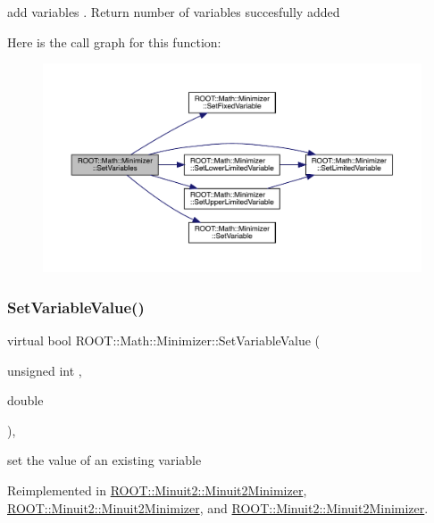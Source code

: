 add variables . Return number of variables succesfully added 

Here is the call graph for this function\+:
\nopagebreak
\begin{figure}[H]
\begin{center}
\leavevmode
\includegraphics[width=350pt]{dc/dc4/classROOT_1_1Math_1_1Minimizer_a314040274ee907fba52726275a28c9f7_cgraph}
\end{center}
\end{figure}
\mbox{\label{classROOT_1_1Math_1_1Minimizer_a47e9a16c7a0b4ecfe769ee4be048d5c3}} 
\subsubsection{\texorpdfstring{SetVariableValue()}{SetVariableValue()}\hspace{0.1cm}{\footnotesize\ttfamily [1/3]}}
{\footnotesize\ttfamily virtual bool R\+O\+O\+T\+::\+Math\+::\+Minimizer\+::\+Set\+Variable\+Value (\begin{DoxyParamCaption}\item[{unsigned int}]{,  }\item[{double}]{ }\end{DoxyParamCaption})\hspace{0.3cm}{\ttfamily [inline]}, {\ttfamily [virtual]}}



set the value of an existing variable 



Reimplemented in \mbox{\hyperlink{classROOT_1_1Minuit2_1_1Minuit2Minimizer_a474e05b30c1227e9cc39fb597027f426}{R\+O\+O\+T\+::\+Minuit2\+::\+Minuit2\+Minimizer}}, \mbox{\hyperlink{classROOT_1_1Minuit2_1_1Minuit2Minimizer_a474e05b30c1227e9cc39fb597027f426}{R\+O\+O\+T\+::\+Minuit2\+::\+Minuit2\+Minimizer}}, and \mbox{\hyperlink{classROOT_1_1Minuit2_1_1Minuit2Minimizer_a474e05b30c1227e9cc39fb597027f426}{R\+O\+O\+T\+::\+Minuit2\+::\+Minuit2\+Minimizer}}.


